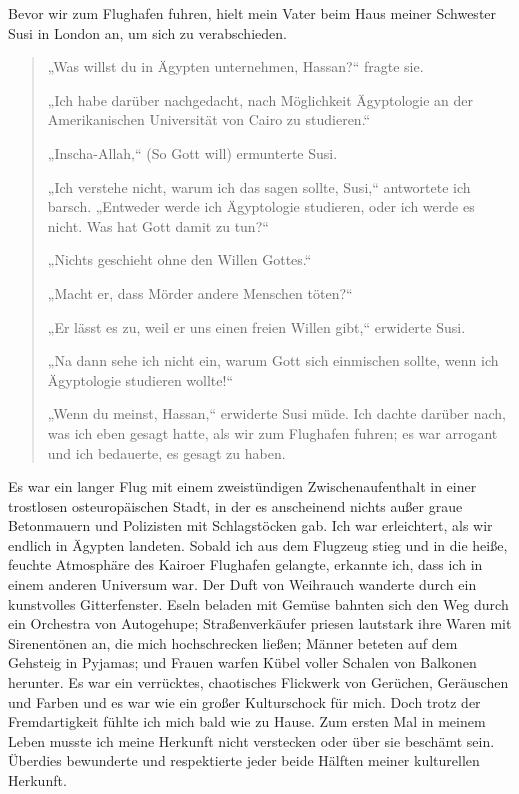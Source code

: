 \documentclass[12pt]{memoir}
\begin{document}
Bevor wir zum Flughafen fuhren,
hielt mein Vater beim Haus meiner Schwester Susi in London an,
um sich zu verabschieden.

\begin{quote}
„Was willst du in Ägypten unternehmen, Hassan?“ fragte sie.

„Ich habe darüber nachgedacht, nach Möglichkeit Ägyptologie
an der Amerikanischen Universität von Cairo zu studieren.“

„Inscha-Allah,“ (So Gott will) ermunterte Susi.

„Ich verstehe nicht, warum ich das sagen sollte, Susi,“ antwortete ich barsch.
„Entweder werde ich Ägyptologie studieren, oder ich werde es nicht.
Was hat Gott damit zu tun?“

„Nichts geschieht ohne den Willen Gottes.“

„Macht er, dass Mörder andere Menschen töten?“

„Er lässt es zu, weil er uns einen freien Willen gibt,“ erwiderte Susi.

„Na dann sehe ich nicht ein, warum Gott sich einmischen sollte,
wenn ich Ägyptologie studieren wollte!“

„Wenn du meinst, Hassan,“ erwiderte Susi müde.
Ich dachte darüber nach, was ich eben gesagt hatte,
als wir zum Flughafen fuhren;
es war arrogant und ich bedauerte, es gesagt zu haben.
\end{quote}

Es war ein langer Flug mit einem zweistündigen Zwischenaufenthalt
in einer trostlosen osteuropäischen Stadt,
in der es anscheinend nichts außer graue Betonmauern
und Polizisten mit Schlagstöcken gab.
Ich war erleichtert, als wir endlich in Ägypten landeten.
Sobald ich aus dem Flugzeug stieg und in die heiße,
feuchte Atmosphäre des Kairoer Flughafen gelangte, erkannte ich,
dass ich in einem anderen Universum war.
Der Duft von Weihrauch wanderte durch ein kunstvolles Gitterfenster.
Eseln beladen mit Gemüse bahnten sich den Weg
durch ein Orchestra von Autogehupe;
Straßenverkäufer priesen lautstark ihre Waren mit Sirenentönen an,
die mich hochschrecken ließen;
Männer beteten auf dem Gehsteig in Pyjamas;
und Frauen warfen Kübel voller Schalen von Balkonen herunter.
Es war ein verrücktes, chaotisches Flickwerk von Gerüchen,
Geräuschen und Farben und es war wie ein großer Kulturschock für mich.
Doch trotz der Fremdartigkeit fühlte ich mich bald wie zu Hause.
Zum ersten Mal in meinem Leben musste ich meine Herkunft nicht verstecken
oder über sie beschämt sein.
Überdies bewunderte und respektierte jeder beide Hälften
meiner kulturellen Herkunft.
\end{document}
